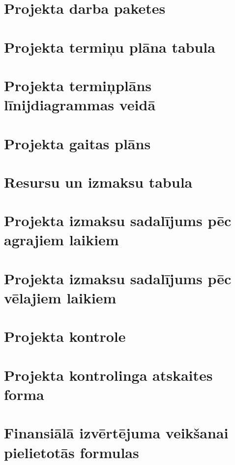 \section{Projekta darba paketes}
	\label{app:Projekta_darba_paketes}
    \clearpage
\section{Projekta termiņu plāna tabula}
	\label{app:Projekta_terminu_plans}
    \clearpage
\section{Projekta termiņplāns līnijdiagrammas veidā}
	\label{app:Projekta_linijdiagrammas}
    \clearpage
\section{Projekta gaitas plāns}
	\label{app:Projekta_gaitas_plans}
    \clearpage
\section{Resursu un izmaksu tabula}
	\label{app:Projekta_resursu_izmaksu_tabula}
    \clearpage
\section{Projekta izmaksu sadalījums pēc agrajiem laikiem}
	\label{app:Projekta_izmaksu_salidzinajums_agrais}
    \clearpage
\section{Projekta izmaksu sadalījums pēc vēlajiem laikiem}
	\label{app:Projekta_izmaksu_salidzinajums_velais}
    \clearpage
\section{Projekta kontrole}
	\label{app:Projekta_konrole}
    \clearpage
\section{Projekta kontrolinga atskaites forma}
	\label{app:Projekta_atskaitas_forma}
    \clearpage
\section{Finansiālā izvērtējuma veikšanai pielietotās formulas }
	\label{app:Projekta_formulas}
    \clearpage
